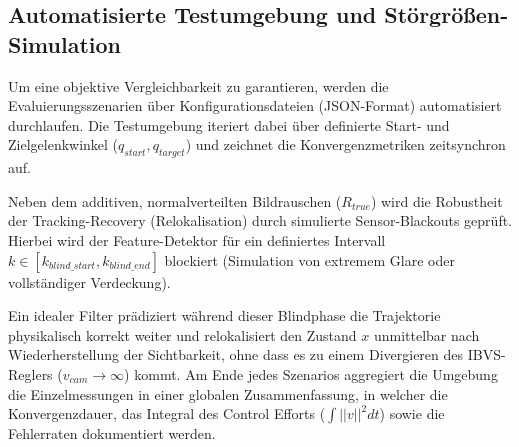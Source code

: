 \documentclass{article}
\begin{document}
\subsection{Automatisierte Testumgebung und Störgrößen-Simulation}
Um eine objektive Vergleichbarkeit zu garantieren, werden die Evaluierungsszenarien über Konfigurationsdateien (JSON-Format) automatisiert durchlaufen. Die Testumgebung iteriert dabei über definierte Start- und Zielgelenkwinkel ($q_{start}, q_{target}$) und zeichnet die Konvergenzmetriken zeitsynchron auf.

Neben dem additiven, normalverteilten Bildrauschen ($R_{true}$) wird die Robustheit der Tracking-Recovery (Relokalisation) durch simulierte Sensor-Blackouts geprüft. Hierbei wird der Feature-Detektor für ein definiertes Intervall $k \in [k_{blind\_start}, k_{blind\_end}]$ blockiert (Simulation von extremem Glare oder vollständiger Verdeckung). 

Ein idealer Filter prädiziert während dieser Blindphase die Trajektorie physikalisch korrekt weiter und relokalisiert den Zustand $x$ unmittelbar nach Wiederherstellung der Sichtbarkeit, ohne dass es zu einem Divergieren des IBVS-Reglers ($v_{cam} \rightarrow \infty$) kommt. Am Ende jedes Szenarios aggregiert die Umgebung die Einzelmessungen in einer globalen Zusammenfassung, in welcher die Konvergenzdauer, das Integral des Control Efforts ($\int ||v||^2 dt$) sowie die Fehlerraten dokumentiert werden.
\end{document}
